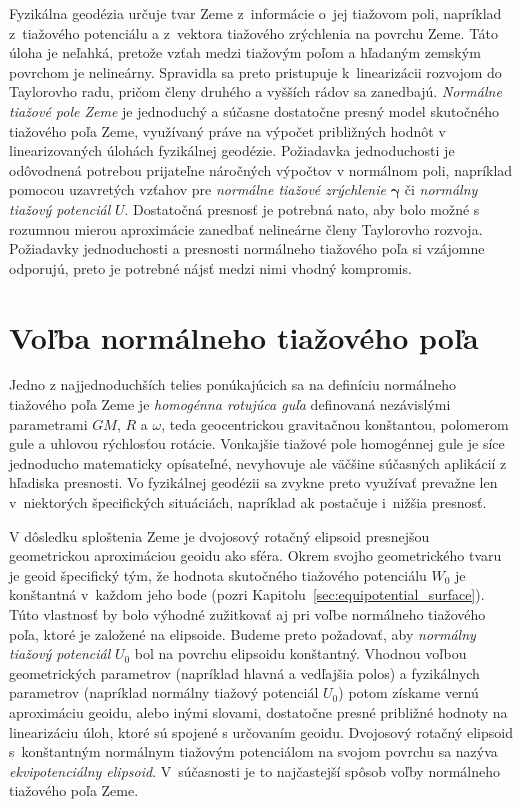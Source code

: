 \documentclass[a4paper,12pt]{book}
\begin{document}
Fyzikálna geodézia určuje tvar Zeme z~informácie o~jej tiažovom poli, napríklad 
z~tiažového potenciálu a z~vektora tiažového zrýchlenia na povrchu Zeme.  Táto 
úloha je neľahká, pretože vzťah medzi tiažovým poľom a hľadaným zemským 
povrchom je nelineárny.  Spravidla sa preto pristupuje k~linearizácii rozvojom 
do Taylorovho radu, pričom členy druhého a vyšších rádov sa zanedbajú.  
\emph{Normálne tiažové pole Zeme} je jednoduchý a súčasne dostatočne presný 
model skutočného tiažového poľa Zeme, využívaný práve na výpočet približných 
hodnôt v linearizovaných úlohách fyzikálnej geodézie.  Požiadavka jednoduchosti 
je odôvodnená potrebou prijateľne náročných výpočtov v normálnom poli, 
napríklad pomocou uzavretých vzťahov pre \emph{normálne tiažové zrýchlenie} 
$\boldsymbol{\gamma}$ či \emph{normálny tiažový potenciál} $U$.  Dostatočná 
presnosť je potrebná nato, aby bolo možné s rozumnou mierou aproximácie 
zanedbať nelineárne členy Taylorovho rozvoja.  Požiadavky jednoduchosti 
a presnosti normálneho tiažového poľa si vzájomne odporujú, preto je potrebné 
nájsť medzi nimi vhodný kompromis.

\section{Voľba normálneho tiažového poľa}
\label{sec:choice_of_normal_gravity_field}

Jedno z najjednoduchších telies ponúkajúcich sa na definíciu normálneho 
tiažového poľa Zeme je \emph{homogénna rotujúca guľa} definovaná nezávislými 
parametrami $GM$, $R$ a $\omega$, teda geocentrickou gravitačnou konštantou, 
polomerom gule a uhlovou rýchlosťou rotácie.  Vonkajšie tiažové pole homogénnej 
gule je síce jednoducho matematicky opísateľné, nevyhovuje ale väčšine 
súčasných aplikácií z hľadiska presnosti.  Vo fyzikálnej geodézii sa zvykne 
preto využívať prevažne len v~niektorých špecifických situáciách, napríklad ak 
postačuje i~nižšia presnosť.

V dôsledku sploštenia Zeme je dvojosový rotačný elipsoid presnejšou 
geometrickou aproximáciou geoidu ako sféra.  Okrem svojho geometrického tvaru 
je geoid špecifický tým, že hodnota skutočného tiažového potenciálu $W_0$ je 
konštantná v~každom jeho bode (pozri Kapitolu~\ref{sec:equipotential_surface}).  
Túto vlastnosť by bolo výhodné zužitkovať aj pri voľbe normálneho tiažového 
poľa, ktoré je založené na elipsoide.  Budeme preto požadovať, aby 
\emph{normálny tiažový potenciál} $U_0$ bol na povrchu elipsoidu konštantný.  
Vhodnou voľbou geometrických parametrov (napríklad hlavná a vedľajšia polos) 
a fyzikálnych parametrov (napríklad normálny tiažový potenciál $U_0$) potom 
získame vernú aproximáciu geoidu, alebo inými slovami, dostatočne presné 
približné hodnoty na linearizáciu úloh, ktoré sú spojené s určovaním geoidu.  
Dvojosový rotačný elipsoid s~konštantným normálnym tiažovým potenciálom na 
svojom povrchu sa nazýva \emph{ekvipotenciálny elipsoid}.  V~súčasnosti je to 
najčastejší spôsob voľby normálneho tiažového poľa Zeme.
\end{document}

